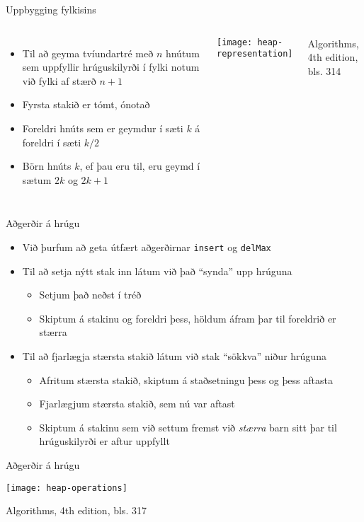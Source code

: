 \documentclass{beamer}
\begin{document}
\begin{frame}{Uppbygging fylkisins}
	\begin{columns}
		\begin{itemize}
			\item Til að geyma tvíundartré með $n$ hnútum sem uppfyllir hrúguskilyrði í fylki notum við fylki af stærð $n+1$
			\item Fyrsta stakið er tómt, ónotað
			\item Foreldri hnúts sem er geymdur í sæti $k$ á foreldri í sæti $k/2$
			\item Börn hnúts $k$, ef þau eru til, eru geymd í sætum $2k$ og $2k+1$
		\end{itemize}
		\texttt{[image: heap-representation]}

		Algorithms, 4th edition, bls. 314
	\end{columns}
\end{frame}

\begin{frame}{Aðgerðir á hrúgu}
	\begin{itemize}
		\item Við þurfum að geta útfært aðgerðirnar \texttt{insert} og \texttt{delMax}
		\item Til að setja nýtt stak inn látum við það ``synda'' upp hrúguna
		\begin{itemize}
			\item Setjum það neðst í tréð
			\item Skiptum á stakinu og foreldri þess, höldum áfram þar til foreldrið er stærra
		\end{itemize}
		\item Til að fjarlægja stærsta stakið látum við stak ``sökkva'' niður hrúguna
		\begin{itemize}
			\item Afritum stærsta stakið, skiptum á staðsetningu þess og þess aftasta
			\item Fjarlægjum stærsta stakið, sem nú var aftast
			\item Skiptum á stakinu sem við settum fremst við \emph{stærra} barn sitt þar til hrúguskilyrði er aftur uppfyllt
		\end{itemize}
	\end{itemize}
\end{frame}

\headonly

\begin{frame}{Aðgerðir á hrúgu}
	\begin{center}
		\texttt{[image: heap-operations]}
	\end{center}
	Algorithms, 4th edition, bls. 317
\end{frame}
\end{document}
